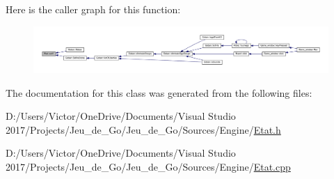 Here is the caller graph for this function\+:\nopagebreak
\begin{figure}[H]
\begin{center}
\leavevmode
\includegraphics[width=350pt]{class_etat_a8a54fc9ecb1b97d84d2f1f259e3bf70e_icgraph}
\end{center}
\end{figure}


The documentation for this class was generated from the following files\+:\begin{DoxyCompactItemize}
\item 
D\+:/\+Users/\+Victor/\+One\+Drive/\+Documents/\+Visual Studio 2017/\+Projects/\+Jeu\+\_\+de\+\_\+\+Go/\+Jeu\+\_\+de\+\_\+\+Go/\+Sources/\+Engine/\hyperlink{_etat_8h}{Etat.\+h}\item 
D\+:/\+Users/\+Victor/\+One\+Drive/\+Documents/\+Visual Studio 2017/\+Projects/\+Jeu\+\_\+de\+\_\+\+Go/\+Jeu\+\_\+de\+\_\+\+Go/\+Sources/\+Engine/\hyperlink{_etat_8cpp}{Etat.\+cpp}\end{DoxyCompactItemize}
